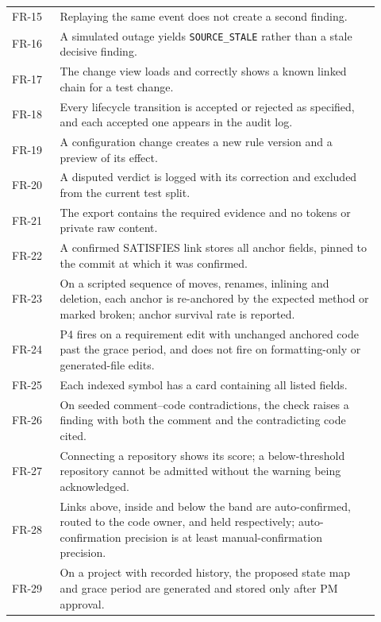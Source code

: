 \begin{longtable}{>{\raggedright\arraybackslash}p{0.12\linewidth} >{\raggedright\arraybackslash}p{0.8\linewidth}}
FR-15 & Replaying the same event does not create a second finding. \\
FR-16 & A simulated outage yields \texttt{SOURCE\_STALE} rather than a stale
        decisive finding. \\
FR-17 & The change view loads and correctly shows a known linked chain for a
        test change. \\
FR-18 & Every lifecycle transition is accepted or rejected as specified, and each
        accepted one appears in the audit log. \\
FR-19 & A configuration change creates a new rule version and a preview of its
        effect. \\
FR-20 & A disputed verdict is logged with its correction and excluded from the
        current test split. \\
FR-21 & The export contains the required evidence and no tokens or private raw
        content. \\
FR-22 & A confirmed SATISFIES link stores all anchor fields, pinned to the
        commit at which it was confirmed. \\
FR-23 & On a scripted sequence of moves, renames, inlining and deletion, each
        anchor is re-anchored by the expected method or marked broken; anchor
        survival rate is reported. \\
FR-24 & P4 fires on a requirement edit with unchanged anchored code past the
        grace period, and does not fire on formatting-only or generated-file
        edits. \\
FR-25 & Each indexed symbol has a card containing all listed fields. \\
FR-26 & On seeded comment--code contradictions, the check raises a finding with
        both the comment and the contradicting code cited. \\
FR-27 & Connecting a repository shows its score; a below-threshold repository
        cannot be admitted without the warning being acknowledged. \\
FR-28 & Links above, inside and below the band are auto-confirmed, routed to the
        code owner, and held respectively; auto-confirmation precision is at
        least manual-confirmation precision. \\
FR-29 & On a project with recorded history, the proposed state map and grace
        period are generated and stored only after PM approval. \\
\hline
\end{longtable}


